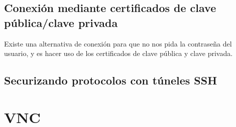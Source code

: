 \subsection{Conexión mediante certificados de clave pública/clave privada}

Existe una alternativa de conexión para que no nos pida la contraseña del usuario, y es hacer uso de los certificados de clave pública y clave privada.





\subsection{Securizando protocolos con túneles SSH}







\section{VNC}






\clearpage